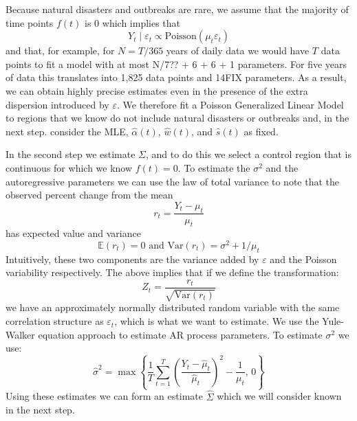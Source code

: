 \documentclass[11pt]{article}
\begin{document}
Because natural disasters and outbreaks are rare, we assume that the majority of time points $f(t)$ is 0 which implies that 
\begin{equation*}
    Y_t \mid \varepsilon_t \propto \mbox{Poisson}(\mu_t  \varepsilon_t )
\end{equation*}
and that, for example, for $N = T / 365$ years of daily data we would have $T$ data points to fit a model with at most N/7?? + 6 + 6 + 1 parameters. For five years of data this translates into 1,825 data points and 14FIX parameters. As a result, we can obtain highly precise estimates even in the presence of the extra dispersion introduced by $\varepsilon$. We therefore fit a Poisson Generalized Linear Model to regions that we know do not include natural disasters or outbreaks and, in the next step. consider the MLE, $\hat{\alpha}(t)$, $\hat{w}(t)$, and $\hat{s}(t)$ as fixed.

In the second step we estimate $\Sigma$, and to do this we select a control region that is continuous for which we know $f(t)=0$. To estimate the $\sigma^2$ and the autoregressive parameters we can use the law of total variance to note that the observed percent change from the mean
\begin{equation*}
    r_t = \frac{Y_t - \mu_t}{\mu_t}
\end{equation*}
has expected value and variance
\begin{equation*}
    \mathbb{E}\left(r_t \right) = 0 \mbox{ and } \mbox{Var}\left(r_t\right)= \sigma^2 + 1/\mu_t
\end{equation*}
Intuitively, these two components are the variance added by $\varepsilon$ and the Poisson variability respectively. The above implies that if we define the transformation:
\begin{equation*}
    Z_t = \frac{r_t}{\sqrt{\mbox{Var}\left(r_t\right)}}
\end{equation*}
we have an approximately normally distributed random variable with the same correlation structure as $\varepsilon_t$, which is what we want to estimate. We use the Yule-Walker equation approach to estimate AR process parameters. To estimate $\sigma^2$ we use:
\begin{equation*}
    \hat{\sigma}^2 = \max\left\{ \frac{1}{T}\sum_{t=1}^T  \left(\frac{Y_t - \hat{\mu}_t}{\hat{\mu}_t}\right)^2  - \frac{1}{\mu_t}, \, 0\right\}
\end{equation*}
Using these estimates we can form an estimate $\hat{\Sigma}$ which we will consider known in the next step.
\end{document}
